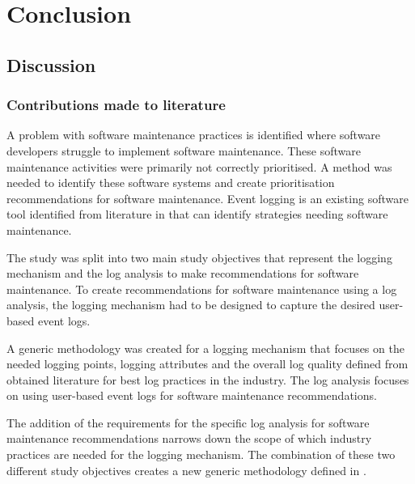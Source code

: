 \chapter{Conclusion}
\label{chap:4}

\section{Discussion}

\subsection{Contributions made to literature}
A problem with software maintenance practices is identified where software developers struggle to
implement software maintenance. These software maintenance activities were primarily not correctly
prioritised. A method was needed to identify these software systems and create prioritisation
recommendations for software maintenance. Event logging is an existing software tool identified from
literature in  that can identify strategies needing software maintenance. \par The study
was split into two main study objectives that represent the logging mechanism and the log analysis
to make recommendations for software maintenance. To create recommendations for software maintenance
using a log analysis, the logging mechanism had to be designed to capture the desired user-based
event logs. \par A generic methodology was created for a logging mechanism that focuses on the
needed logging points, logging attributes and the overall log quality defined from obtained
literature for best log practices in the industry. The log analysis focuses on using user-based
event logs for software maintenance recommendations.\par The addition of the requirements for the
specific log analysis for software maintenance recommendations narrows down the scope of which
industry practices are needed for the logging mechanism. The combination of these two different study
objectives creates a new generic methodology defined in .

